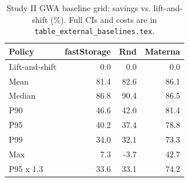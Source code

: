 \begin{table}[t]
\caption{Study II GWA baseline grid: savings vs. lift-and-shift (\%). Full CIs
and costs are in \texttt{table\_external\_baselines.tex}.}
\label{tab:external-baselines}
\centering
\scriptsize
\renewcommand{\arraystretch}{1.03}
\setlength{\tabcolsep}{2.6pt}
\begin{tabular}{@{}l r r r@{}}
\toprule
Policy & fastStorage & Rnd & Materna \\
\midrule
Lift-and-shift & 0.0 & 0.0 & 0.0 \\
Mean & 81.4 & 82.6 & 86.1 \\
Median & 86.8 & 90.4 & 86.5 \\
P90 & 46.6 & 42.0 & 81.4 \\
P95 & 40.2 & 37.4 & 78.8 \\
P99 & 34.0 & 32.1 & 73.3 \\
Max & 7.3 & -3.7 & 42.7 \\
P95 x 1.3 & 33.6 & 33.1 & 74.2 \\
\bottomrule
\end{tabular}
\end{table}
